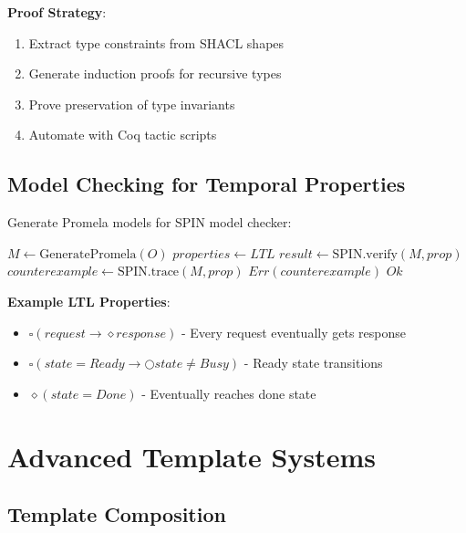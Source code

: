 \textbf{Proof Strategy}:
\begin{enumerate}
    \item Extract type constraints from SHACL shapes
    \item Generate induction proofs for recursive types
    \item Prove preservation of type invariants
    \item Automate with Coq tactic scripts
\end{enumerate}

\subsection{Model Checking for Temporal Properties}

Generate Promela models for SPIN model checker:

\begin{algorithm}
\caption{Temporal Property Verification}
\begin{algorithmic}[1]
    \State $M \gets \text{GeneratePromela}(O)$ 
    \State $properties \gets LTL$ 
        \State $result \gets \text{SPIN.verify}(M, prop)$
            \State $counterexample \gets \text{SPIN.trace}(M, prop)$
            \State \Return $Err(counterexample)$
        \EndIf
    \EndFor
    \State \Return $Ok$
\EndProcedure
\end{algorithmic}
\end{algorithm}

\textbf{Example LTL Properties}:
\begin{itemize}
    \item $\square (request \rightarrow \diamond response)$ - Every request eventually gets response
    \item $\square (state = Ready \rightarrow \bigcirc state \neq Busy)$ - Ready state transitions
    \item $\diamond (state = Done)$ - Eventually reaches done state
\end{itemize}

\section{Advanced Template Systems}

\subsection{Template Composition}

